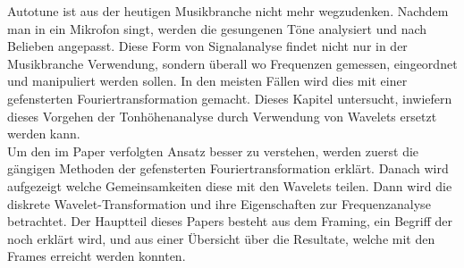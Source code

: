 Autotune ist aus der heutigen Musikbranche nicht mehr wegzudenken. Nachdem man in ein Mikrofon singt, werden die gesungenen Töne analysiert und nach Belieben angepasst. Diese Form von Signalanalyse findet nicht nur in der Musikbranche Verwendung, sondern überall wo Frequenzen gemessen, eingeordnet und manipuliert werden sollen. In den meisten Fällen wird dies mit einer gefensterten Fouriertransformation gemacht. Dieses Kapitel untersucht, inwiefern dieses Vorgehen der Tonhöhenanalyse durch Verwendung von Wavelets ersetzt werden kann.\\

Um den im Paper verfolgten Ansatz besser zu verstehen, werden zuerst die gängigen Methoden der gefensterten Fouriertransformation erklärt. Danach wird aufgezeigt welche Gemeinsamkeiten diese mit den Wavelets teilen. Dann wird die diskrete Wavelet-Transformation und ihre Eigenschaften zur Frequenzanalyse betrachtet. Der Hauptteil dieses Papers besteht aus dem Framing, ein Begriff der noch erklärt wird, und aus einer Übersicht über die Resultate, welche mit den Frames erreicht werden konnten. 